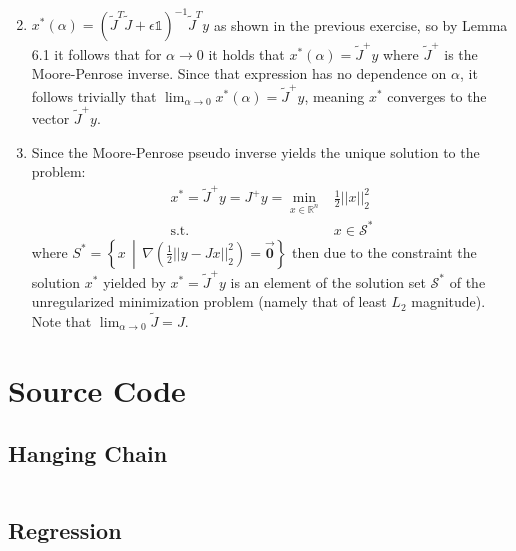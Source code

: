 \documentclass[oneside, a4paper]{book}
\newcommand\abss[1]{\left|\left|#1\right|\right|}
\newcommand\vek[1]{\vec{\bm{#1}}}
\newcommand\br[1]{\left(#1\right)}
\begin{document}
\begin{enumerate}
\begin{align*}
  \end{align*}
  \item $x^*(\alpha) = \br{\tilde{J}^T\tilde{J} + \epsilon \mathds{1}}^{-1} \tilde{J}^T y$ as shown in the previous exercise, so by Lemma 6.1 it follows that for $\alpha \to 0$ it holds that $x^*(\alpha) = \tilde{J}^+ y$ where $\tilde{J}^+$ is the Moore-Penrose inverse. Since that expression has no dependence on $\alpha$, it follows trivially that $\lim_{\alpha\to 0} x^*(\alpha) = \tilde{J}^+ y$, meaning $x^*$ converges to the vector $\tilde{J}^+ y$.
  \item Since the Moore-Penrose pseudo inverse yields the unique solution to the problem: \begin{align*}
    x^* = \tilde{J}^+ y  = J^+ y= \min_{x\in\mathds{R}^n} &\frac{1}{2}\abss{x}_2^2\\
    \text{s.t.}\quad &x\in\mathcal{S}^*
  \end{align*}
  where $S^*=\left\{x \,\middle|\, \nabla \br{\frac{1}{2} \abss{y - Jx}_2^2} = \vek{0}\right\}$ then due to the constraint the solution $x^*$ yielded by $x^*=\tilde{J}^+ y$ is an element of the solution set $\mathcal{S}^*$ of the unregularized minimization problem (namely that of least $L_2$ magnitude). Note that $\lim_{\alpha\to 0} \tilde{J} = J$.
\end{enumerate}

\chapter{Source Code}
\section{Hanging Chain}
\inputminted{python}{ex2_hanging_chain.py}
\section{Regression}
\inputminted{python}{ex2_linreg.py}
\end{document}

